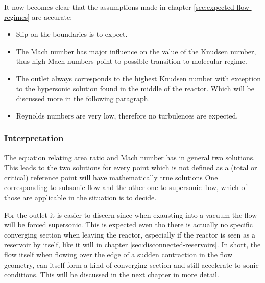 	\noindent It now becomes clear that the assumptions made in chapter \ref{sec:expected-flow-regimes} are accurate:
	\begin{itemize}
		\item Slip on the boundaries is to expect.
		\item The Mach number has major influence on the value of the Knudsen number, thus high Mach numbers point to possible transition to molecular regime.
		\item The outlet always corresponds to the highest Knudsen number with exception to the hypersonic solution found in the middle of the reactor. Which will be discussed more in the following paragraph.
		\item Reynolds numbers are very low, therefore no turbulences are expected.
	\end{itemize}
\subsubsection*{Interpretation}
	The equation relating area ratio and Mach number has in general two solutions.
	This leads to the two solutions for every point which is not defined as a (total or critical) reference point will have mathematically true solutions
	One corresponding to subsonic flow and the other one to supersonic flow, which of those are applicable in the situation is to decide.

	For the outlet it is easier to discern since when exausting into a vacuum the flow will be forced supersonic.
	This is expected even tho there is actually no specific converging section when leaving the reactor, especially if the reactor is seen as a reservoir by itself, like it will in chapter \ref{sec:disconnected-reservoirs}.
	In short, the flow itself when flowing over the edge of a sudden contraction in the flow geometry, can itself form a kind of converging section and still accelerate to sonic conditions.
	This will be discussed in the next chapter in more detail.

